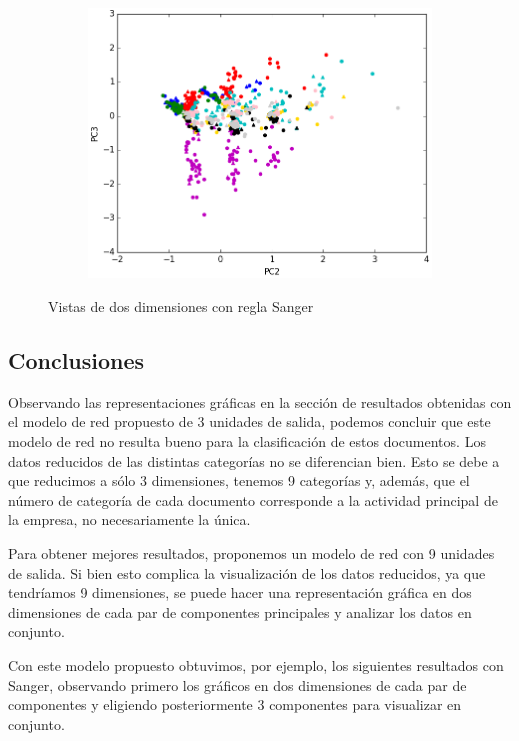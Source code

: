 \begin{figure}[ht!]	
	~\centering
	\begin{subfigure}[b]{0.5\textwidth}
		\includegraphics[width=\linewidth]{img/sanger/3dim-pc2-pc3.png}
	\end{subfigure}%
	\caption{Vistas de dos dimensiones con regla Sanger}
\end{figure}


\newpage

\subsection{Conclusiones}

Observando las representaciones gráficas en la sección de resultados obtenidas con el modelo de red propuesto de 3 unidades de salida, podemos concluir que este modelo de red no resulta bueno para la clasificación de estos documentos. Los datos reducidos de las distintas categorías no se diferencian bien. Esto se debe a que reducimos a sólo 3 dimensiones, tenemos 9 categorías y, además, que el número de categoría de cada documento corresponde a la actividad principal de la empresa, no necesariamente la única. 

Para obtener mejores resultados, proponemos un modelo de red con 9 unidades de salida. Si bien esto complica la visualización de los datos reducidos, ya que tendríamos 9 dimensiones, se puede hacer una representación gráfica en dos dimensiones de cada par de componentes principales y analizar los datos en conjunto.

Con este modelo propuesto obtuvimos, por ejemplo, los siguientes resultados con Sanger, observando primero los gráficos en dos dimensiones de cada par de componentes y eligiendo posteriormente 3 componentes para visualizar en conjunto.\\

